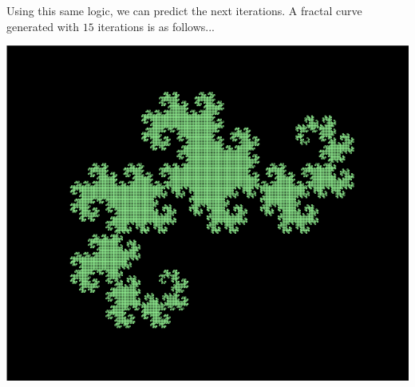 \documentclass[a4paper,12pt]{article}
\begin{document}
\begin{flushleft}
Using this same logic, we can predict the next iterations. A fractal curve generated with $15$ iterations is as follows...

\begin{center}
    \includegraphics[scale=0.35]{images/dragoncurve.png}
\end{center}
\end{flushleft}
\end{document}
